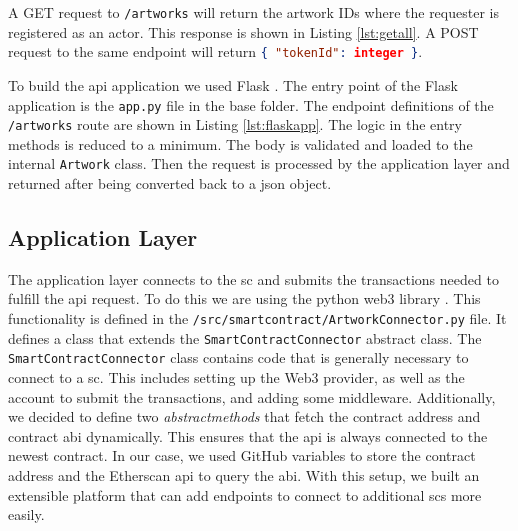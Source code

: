 

A GET request to \texttt{/artworks} will return the artwork IDs where the requester is registered as an actor. This response is shown in Listing \ref{lst:getall}. A POST request to the same endpoint will return \lstinline[language=JSON]!{ "tokenId": integer }!.



To build the \gls{api} application we used Flask \cite{flask}. The entry point of the Flask application is the \texttt{app.py} file in the base folder. The endpoint definitions of the \texttt{/artworks} route are shown in Listing \ref{lst:flaskapp}. The logic in the entry methods is reduced to a minimum. The body is validated and loaded to the internal \texttt{Artwork} class. Then the request is processed by the application layer and returned after being converted back to a \gls{json} object.




\subsection{Application Layer}
The application layer connects to the \gls{sc} and submits the transactions needed to fulfill the \gls{api} request. To do this we are using the python web3 library \cite{web3python}. This functionality is defined in the \texttt{/src/smartcontract/ArtworkConnector.py} file. It defines a class that extends the \texttt{SmartContractConnector} abstract class. The \texttt{SmartContractConnector} class contains code that is generally necessary to connect to a \gls{sc}. This includes setting up the Web3 provider, as well as the account to submit the transactions, and adding some middleware. Additionally, we decided to define two \textit{abstractmethods} that fetch the contract address and contract \gls{abi} dynamically. This ensures that the \gls{api} is always connected to the newest contract. In our case, we used GitHub variables to store the contract address and the Etherscan \cite{etherscan} \gls{api} to query the \gls{abi}. With this setup, we built an extensible platform that can add endpoints to connect to additional \glspl{sc} more easily. 

